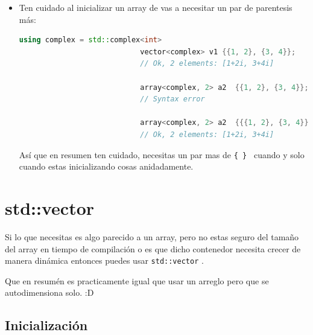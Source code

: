 \documentclass[12pt, fleqn]{report}                             %
\newcommand \Quote              {\qq}                           %
\theoremstyle{break}                                            %
\newcommand{\textCode}[1]  { \texttt{#1} }                      %
\begin{document}
                \begin{itemize}

                    \item 
                    
                        Ten cuidado al inicializar un array de \Quote{cosas} vas a necesitar 
                        un par de parentesis más:
                        \begin{lstlisting}[language=C++, gobble=28]
                            using complex = std::complex<int>
                            vector<complex> v1 {{1, 2}, {3, 4}};      
                            // Ok, 2 elements: [1+2i, 3+4i]
                            
                            array<complex, 2> a2  {{1, 2}, {3, 4}};
                            // Syntax error
                            
                            array<complex, 2> a2  {{{1, 2}, {3, 4}}};
                            // Ok, 2 elements: [1+2i, 3+4i]
                        \end{lstlisting}

                        Así que en resumen ten cuidado, necesitas un par mas de \textCode{\{ \} }
                        cuando y solo cuando estas inicializando cosas anidadamente.
                \end{itemize}

        \clearpage
        \section{std::vector}

            Si lo que necesitas es algo parecido a un array, pero no estas seguro del tamaño del array
            en tiempo de compilación o es que dicho contenedor necesita crecer de manera dinámica
            entonces puedes usar \textCode{std::vector}.

            Que en resumén es practicamente igual que usar un arreglo pero que se autodimensiona solo. :D

            \subsection{Inicialización}
\end{document}
